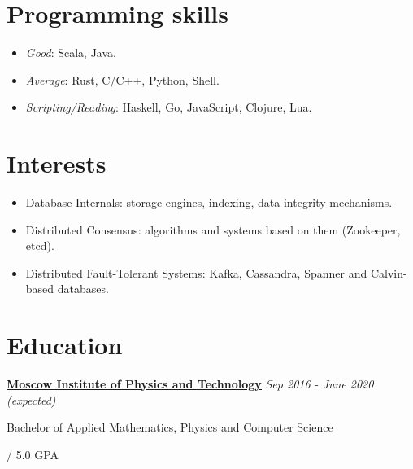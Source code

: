 \documentclass[paper=a4,fontsize=15pt]{scrartcl}
\newcommand{\quarterspace}{\vspace*{0.25em}}
\begin{document}
\section*{Programming skills}{}
\begin{itemize}[noitemsep,leftmargin=20pt,label=\raisebox{0.25ex}{\tiny$\bullet$},topsep=5pt]
    \item \textit{Good}: Scala, Java.
    \item \textit{Average}: Rust, C/C++, Python, Shell.
    \item \textit{Scripting/Reading}: Haskell, Go, JavaScript, Clojure, Lua.
\end{itemize}

\section*{Interests}{}
\begin{itemize}[noitemsep,leftmargin=20pt,label=\raisebox{0.25ex}{\tiny$\bullet$},topsep=5pt]
    \item Database Internals: storage engines, indexing, data integrity mechanisms.
    \item Distributed Consensus: algorithms and systems based on them (Zookeeper, etcd).
    \item Distributed Fault-Tolerant Systems: Kafka, Cassandra, Spanner and Calvin-based databases.
\end{itemize}
\section*{Education}{}
\noindent \href{https://mipt.ru/english/}{\textbf{\ul{Moscow Institute of Physics and Technology}}}
{\hfill \footnotesize \textit{Sep 2016 - June 2020 (expected)}} \par
\noindent Bachelor of Applied Mathematics, Physics and Computer Science \par
\quarterspace
\footnotesize
{} / 5.0 GPA
\end{document}
